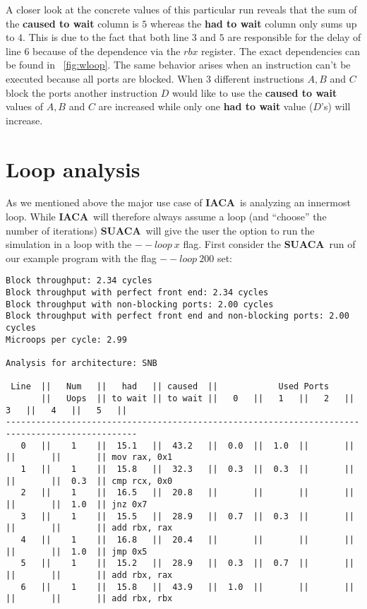 \documentclass[a4paper,12pt,titlepage, twoside]{report}
\newcommand{\suaca}{\textbf{SUACA}}
\newcommand{\iaca}{\textbf{IACA}}
\begin{document}
A closer look at the concrete values of this particular run reveals that the sum of the \textbf{caused to wait} column is $5$ whereas the \textbf{had to wait} column only sums up to $4$. This is due to the fact that both line $3$ and $5$ are responsible for the delay of line $6$ because of the dependence via the $rbx$ register. The exact dependencies can be found in ~\autoref{fig:wloop}. The same behavior arises when an instruction can't be executed because all ports are blocked. When $3$ different instructions $A, B$ and $C$ block the ports another instruction $D$ would like to use the \textbf{caused to wait} values of $A, B$ and $C$ are increased while only one \textbf{had to wait} value ($D$'s) will increase.




\section{Loop analysis}
\label{sec:loop}
As we mentioned above the major use case of \iaca\ is analyzing an innermost loop. While \iaca\ will therefore always assume a loop (and ``choose'' the number of iterations) \suaca\ will give the user the option to run the simulation in a loop with the $--loop\ x$ flag. First consider the \suaca\ run of our example program with the flag $--loop\ 200$ set:

\begin{mdframed}[backgroundcolor=light-gray, roundcorner=10pt,leftmargin=1, rightmargin=1, innerleftmargin=15, innertopmargin=15,innerbottommargin=15, outerlinewidth=1, linecolor=light-gray]
\begin{center}
\begin{BVerbatim}[fontsize=\tiny]
Block throughput: 2.34 cycles
Block throughput with perfect front end: 2.34 cycles
Block throughput with non-blocking ports: 2.00 cycles
Block throughput with perfect front end and non-blocking ports: 2.00 cycles
Microops per cycle: 2.99

Analysis for architecture: SNB

 Line  ||   Num   ||   had   || caused  ||            Used Ports
       ||   Uops  || to wait || to wait ||   0   ||   1   ||   2   ||   3   ||   4   ||   5   ||
------------------------------------------------------------------------------------------------
   0   ||    1    ||  15.1   ||  43.2   ||  0.0  ||  1.0  ||       ||       ||       ||       || mov rax, 0x1
   1   ||    1    ||  15.8   ||  32.3   ||  0.3  ||  0.3  ||       ||       ||       ||  0.3  || cmp rcx, 0x0
   2   ||    1    ||  16.5   ||  20.8   ||       ||       ||       ||       ||       ||  1.0  || jnz 0x7
   3   ||    1    ||  15.5   ||  28.9   ||  0.7  ||  0.3  ||       ||       ||       ||       || add rbx, rax
   4   ||    1    ||  16.8   ||  20.4   ||       ||       ||       ||       ||       ||  1.0  || jmp 0x5
   5   ||    1    ||  15.2   ||  28.9   ||  0.3  ||  0.7  ||       ||       ||       ||       || add rbx, rax
   6   ||    1    ||  15.8   ||  43.9   ||  1.0  ||       ||       ||       ||       ||       || add rbx, rbx
\end{BVerbatim}
\end{center}
\end{mdframed}
\end{document}
